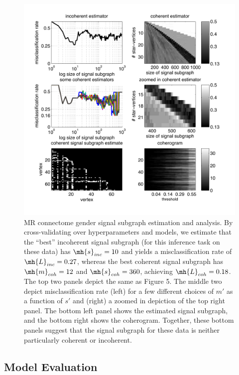 \documentclass[10pt,journal,cspaper,compsoc]{IEEEtran}
\begin{document}


\begin{figure}[htbp]
	\centering
		\includegraphics[width=1.0\linewidth]{../figs/BLSA0317_Count_Lhats_results.pdf}
	\caption{MR connectome gender signal subgraph estimation and analysis. By cross-validating over hyperparameters and models, we estimate that the ``best'' incoherent signal subgraph (for this inference task on these data) has $\mh{s}_{inc}=10$ and yields a misclassification rate of $\mh{L}_{inc}=0.27$, whereas the best coherent signal subgraph has $\mh{m}_{coh}=12$ and $\mh{s}_{coh}=360$, achieving $\mh{L}_{coh}=0.18$.  The top two panels depict the same as Figure 5.  The middle two depict misclassification rate (left) for a few different choices of $m'$ as a function of $s'$ and (right) a zoomed in depiction of the top right panel. The bottom left panel shows the estimated signal subgraph, and the bottom right shows the coherogram.  Together, these bottom panels suggest that the signal subgraph for these data is neither particularly coherent or incoherent.}
	\label{fig:data}
\end{figure}

\subsection{Model Evaluation} %
\label{sub:model_checking}
\end{document}
